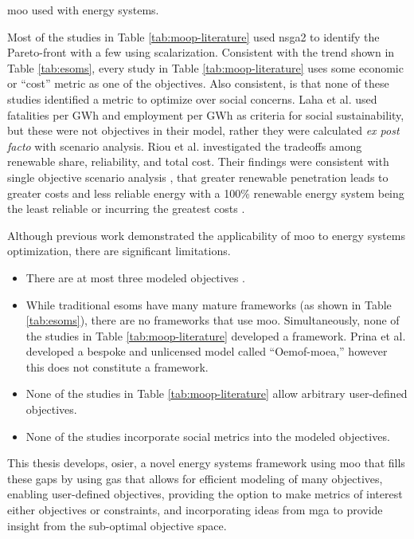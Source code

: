 \begin{table}[ht!]
    \centering
    \caption{\ac{moo} used with energy systems.}
    \label{tab:moop-literature}
    \resizebox*{\textwidth}{!}{}
\end{table}
Most of the studies in Table \ref{tab:moop-literature} used \ac{nsga2} to
identify the Pareto-front with a few using scalarization. Consistent with the
trend shown in Table \ref{tab:esoms}, every study in Table
\ref{tab:moop-literature} uses some economic or ``cost'' metric as one of the
objectives. Also consistent, is that none of these studies identified a metric
to optimize over social concerns. Laha et al. \cite{laha_low_2021} used
fatalities per GWh and employment per GWh as criteria for social sustainability,
but these were not objectives in their model, rather they were calculated
\textit{ex post facto} with scenario analysis. Riou et al.
\cite{riou_multi-objective_2021} investigated the tradeoffs among renewable
share, reliability, and total cost. Their findings were consistent with single
objective scenario analysis \cite{de_sisternes_value_2016}, that greater
renewable penetration leads to greater costs and less reliable energy with a
100\% renewable energy system being the least reliable or incurring the greatest
costs \cite{riou_multi-objective_2021}. 

Although previous work demonstrated the applicability of \ac{moo} to energy
systems optimization, there are significant limitations. 
\begin{itemize}
    \item{There are at most three modeled objectives
    \cite{riou_multi-objective_2021,de-leon_almaraz_deployment_2015,
    de-leon_almaraz_assessment_2013}.}
    \item{While traditional \acp{esom} have many mature frameworks (as shown in
    Table \ref{tab:esoms}), there are no frameworks that use \ac{moo}.
    Simultaneously, none of the studies in Table \ref{tab:moop-literature}
    developed a framework. Prina et al. developed a bespoke and unlicensed model
    called ``Oemof-moea,'' however this does not constitute a framework.}
    \item{None of the studies in Table \ref{tab:moop-literature} allow
    arbitrary user-defined objectives.}
    \item{None of the studies incorporate social metrics into the modeled objectives.}
\end{itemize}

This thesis develops, \ac{osier}, a novel energy systems framework using
\ac{moo} that fills these gaps by using \acp{ga} that allows for efficient
modeling of many objectives, enabling user-defined objectives, providing the
option to make metrics of interest either objectives or constraints, and
incorporating ideas from \ac{mga} to provide insight from the sub-optimal
objective space.


